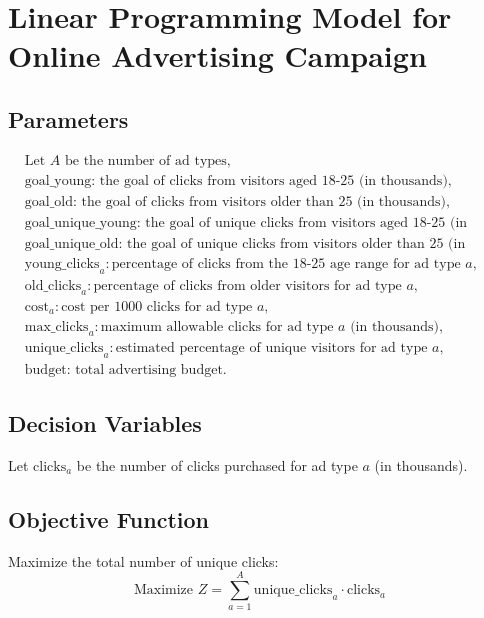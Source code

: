 \documentclass{article}
\begin{document}
\section*{Linear Programming Model for Online Advertising Campaign}

\subsection*{Parameters}
\begin{align*}
& \text{Let } A \text{ be the number of ad types,} \\
& \text{goal\_young: the goal of clicks from visitors aged 18-25 (in thousands),} \\
& \text{goal\_old: the goal of clicks from visitors older than 25 (in thousands),} \\
& \text{goal\_unique\_young: the goal of unique clicks from visitors aged 18-25 (in thousands),} \\
& \text{goal\_unique\_old: the goal of unique clicks from visitors older than 25 (in thousands),} \\
& \text{young\_clicks}_a: \text{percentage of clicks from the 18-25 age range for ad type } a, \\
& \text{old\_clicks}_a: \text{percentage of clicks from older visitors for ad type } a, \\
& \text{cost}_a: \text{cost per 1000 clicks for ad type } a, \\
& \text{max\_clicks}_a: \text{maximum allowable clicks for ad type } a \text{ (in thousands),} \\
& \text{unique\_clicks}_a: \text{estimated percentage of unique visitors for ad type } a, \\
& \text{budget: total advertising budget.}
\end{align*}

\subsection*{Decision Variables}
Let \( \text{clicks}_a \) be the number of clicks purchased for ad type \( a \) (in thousands).

\subsection*{Objective Function}
Maximize the total number of unique clicks:
\[
\text{Maximize } Z = \sum_{a=1}^{A} \text{unique\_clicks}_a \cdot \text{clicks}_a
\]
\end{document}
